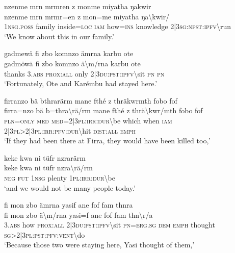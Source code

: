 \ea\label{ex:4:a1811}
nzenme mrn mrmren z monme miyatha ŋakwir\\
\gll nzenme	mrn	mrmr=en	z	mon=me	miyatha	ŋa{\textbackslash}kwir/\\
     1\textsc{nsg}.\textsc{poss}	family	inside=\textsc{loc}	\textsc{iam}	how=\textsc{ins}	knowledge	2|3\textsc{sg}:\textsc{npst}:\textsc{ipfv}{\textbackslash}run\\
\glt `We know about this in our family.'
\z

\ea\label{ex:4:a1812}
gadmewä fi zbo komnzo ämrna karbu ote\\
\gll gadmöwä	fi	zbo	komnzo	ä{\textbackslash}m/rna	karbu	ote\\
     thanks	3.\textsc{abs}	\textsc{prox}:\textsc{all}	only	2|3\textsc{du}:\textsc{pst}:\textsc{ipfv}{\textbackslash}sit	\textsc{pn}	\textsc{pn}\\
\glt `Fortunately, Ote and Karémbu had stayed here.'
\z

\ea\label{ex:4:a1813}
firranzo bä bthrarärm mane fthé z thräkwrmth fobo fof\\
\gll firra=nzo	bä	b=thra{\textbackslash}rä/rm	mane	fthé	z	thrä{\textbackslash}kwr/mth	fobo	fof\\
     \textsc{pln}=\textsc{only}	\textsc{med}	\textsc{med}=2|3\textsc{pl}:\textsc{irr}:\textsc{dur}{\textbackslash}be	which	when	\textsc{iam}	2|3\textsc{pl}>2|3\textsc{pl}:\textsc{irr}:\textsc{pfv}:\textsc{dur}{\textbackslash}hit	\textsc{dist}:\textsc{all}	\textsc{emph}\\
\glt `If they had been there at Firra, they would have been killed too,'
\z

\ea\label{ex:4:a1814}
keke kwa ni tüfr nzrarärm\\
\gll keke	kwa	ni	tüfr	nzra{\textbackslash}rä/rm\\
     \textsc{neg}	\textsc{fut}	1\textsc{nsg}	plenty	1\textsc{pl}:\textsc{irr}:\textsc{dur}{\textbackslash}be\\
\glt `and we would not be many people today.'
\z

\ea\label{ex:4:a1815}
fi mon zbo ämrna yasif ane fof fam thnra\\
\gll fi	mon	zbo	ä{\textbackslash}m/rna	yasi=f	ane	fof	fam	thn{\textbackslash}r/a\\
     3.\textsc{abs}	how	\textsc{prox}:\textsc{all}	2|3\textsc{du}:\textsc{pst}:\textsc{ipfv}{\textbackslash}sit	\textsc{pn}=\textsc{erg}.\textsc{sg}	\textsc{dem}	\textsc{emph}	thought	\textsc{sg}>2|3\textsc{pl}:\textsc{pst}:\textsc{pfv}:\textsc{vent}{\textbackslash}do\\
\glt `Because those two were staying here, Yasi thought of them,'
\z

